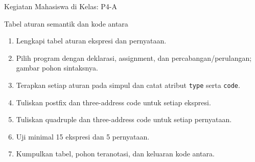 \documentclass[aspectratio=169,10pt,t]{beamer}
\begin{document}

\begin{frame}{Kegiatan Mahasiswa di Kelas: P4-A}
  \begin{block}{Tabel aturan semantik dan kode antara}
    \footnotesize
    \begin{enumerate}
      \setlength{\itemsep}{1pt}
      \item Lengkapi tabel aturan ekspresi dan pernyataan.
      \item Pilih program dengan deklarasi, assignment, dan
            percabangan/perulangan; gambar pohon sintaksnya.
      \item Terapkan setiap aturan pada simpul dan catat atribut
            \texttt{type} serta \texttt{code}.
      \item Tuliskan postfix dan three-address code untuk setiap
            ekspresi.
      \item Tuliskan quadruple dan three-address code untuk setiap
            pernyataan.
      \item Uji minimal 15 ekspresi dan 5 pernyataan.
      \item Kumpulkan tabel, pohon teranotasi, dan keluaran kode antara.
    \end{enumerate}
  \end{block}
\end{frame}
\end{document}
